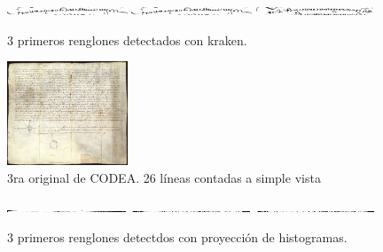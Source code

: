 \documentclass[11pt,a4paper]{article}
\begin{document}
\begin{figure}[H] 
\centering 
\begin{minipage}{1.0\textwidth} 
\includegraphics[width=0.32\textwidth]{2_CODEA_1_kraken.png} 
\includegraphics[width=0.32\textwidth]{2_CODEA_2_kraken.png} 
\includegraphics[width=0.32\textwidth]{2_CODEA_3_kraken.png} 
\caption{3 primeros renglones detectados con kraken.} 
\label{fig:3 líneas kraken 2da CODEA} 
\end{minipage} 
\end{figure}


\begin{figure}[H] 
\centering 
\begin{minipage}{1.0\textwidth} 
\includegraphics[width=0.32\textwidth]{CODEA-0871_1r.jpg} 
\caption{3ra original de CODEA. 26 líneas contadas a simple vista} 
\label{fig:3ra CODEA} 
\end{minipage} 
\end{figure}

\begin{figure}[H] 
\centering 
\begin{minipage}{1.0\textwidth} 
\includegraphics[width=0.32\textwidth]{3_CODEA_1_PH.png} 
\includegraphics[width=0.32\textwidth]{3_CODEA_2_PH.png} 
\includegraphics[width=0.32\textwidth]{3_CODEA_3_PH.png} 
\caption{3 primeros renglones detectdos con proyección de histogramas.} 
\label{fig:3 líneas PH 3ra CODEA} 
\end{minipage} 
\end{figure}
\end{document}
